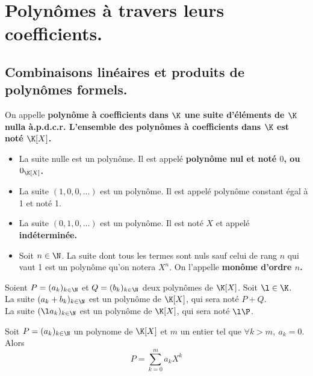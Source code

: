 \documentclass[11pt]{article}
\begin{document}


\thispagestyle{fancy}

\section{Polynômes à travers leurs coefficients.}

\subsection{Combinaisons linéaires et produits de polynômes formels.}

\begin{defi}{}{}
    On appelle \bf{polynôme} à coefficients dans $\K$ une suite d'éléments de $\K$ nulla à.p.d.c.r.\n
    L'\bf{ensemble des polynômes} à coefficients dans $\K$ est noté $\K[X]$.
    \begin{itemize}
        \item La suite nulle est un polynôme. Il est appelé \bf{polynôme nul} et noté $0$, ou $0_{\K[X]}$.
        \item La suite $(1,0,0,...)$ est un polynôme. Il est appelé polynôme constant égal à 1 et noté 1.
        \item La suite $(0,1,0,...)$ est un polynôme. Il est noté $X$ et appelé \bf{indéterminée}.
        \item Soit $n\in\N$. La suite dont tous les termes sont nuls sauf celui de rang $n$ qui vaut 1 est un polynôme qu'on notera $X^n$. On l'appelle \bf{monôme} d'ordre $n$.
    \end{itemize}
\end{defi}

\begin{defi}{}{}
    Soient $P=(a_k)_{k\in\N}$ et $Q=(b_k)_{k\in\N}$ deux polynômes de $\K[X]$. Soit $\l\in\K$.\\
    La suite $(a_k+b_k)_{k\in\N}$ est un polynôme de $\K[X]$, qui sera noté $P+Q$.\\
    La suite $(\l a_k)_{k\in\N}$ est un polynôme de $\K[X]$, qui sera noté $\l\P$.
\end{defi}

\begin{corr}{}{}
    Soit $P=(a_k)_{k\in\N}$ un polynome de $\K[X]$ et $m$ un entier tel que $\forall k > m, ~ a_k = 0$. Alors
    \begin{equation*}
        P=\sum_{k=0}^ma_kX^k
    \end{equation*}
\end{corr}
\end{document}

